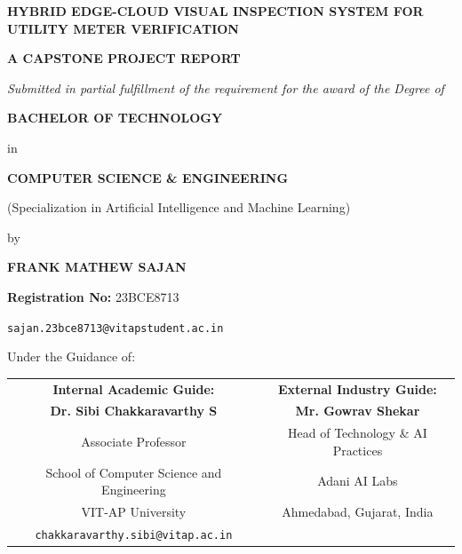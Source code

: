 \documentclass[12pt,a4paper,oneside]{report}
\begin{document}

\begin{titlepage}
    \centering
    \vspace*{0.2cm}
    
    {\Large\bfseries HYBRID EDGE-CLOUD VISUAL INSPECTION SYSTEM FOR UTILITY METER VERIFICATION\par}
    
    \vspace{0.6cm}
    {\large\bfseries A CAPSTONE PROJECT REPORT\par}
    \vspace{0.25cm}
    {\normalsize\itshape Submitted in partial fulfillment of the requirement for the award of the Degree of\par}
    \vspace{0.25cm}
    {\large\bfseries BACHELOR OF TECHNOLOGY\par}
    {\large in\par}
    {\large\bfseries COMPUTER SCIENCE \& ENGINEERING\par}
    {\normalsize (Specialization in Artificial Intelligence and Machine Learning)\par}
    
    \vspace{0.6cm}
    {\normalsize by\par}
    \vspace{0.15cm}
    {\large\bfseries FRANK MATHEW SAJAN\par}
    {\normalsize \textbf{Registration No:} 23BCE8713\par}
    {\normalsize \texttt{sajan.23bce8713@vitapstudent.ac.in}\par}
    
    \vspace{0.6cm}
    {\normalsize Under the Guidance of:\par}
    \vspace{0.25cm}
    \begin{tabular*}{\textwidth}{@{\extracolsep{\fill}}cc}
    \textbf{Internal Academic Guide:} & \textbf{External Industry Guide:} \\
    \textbf{Dr. Sibi Chakkaravarthy S} & \textbf{Mr. Gowrav Shekar} \\
    Associate Professor & Head of Technology \& AI Practices \\
    School of Computer Science and Engineering & Adani AI Labs \\
    VIT-AP University & Ahmedabad, Gujarat, India \\
    \texttt{chakkaravarthy.sibi@vitap.ac.in} & \\
    \end{tabular*}
    

\end{titlepage}
\end{document}
